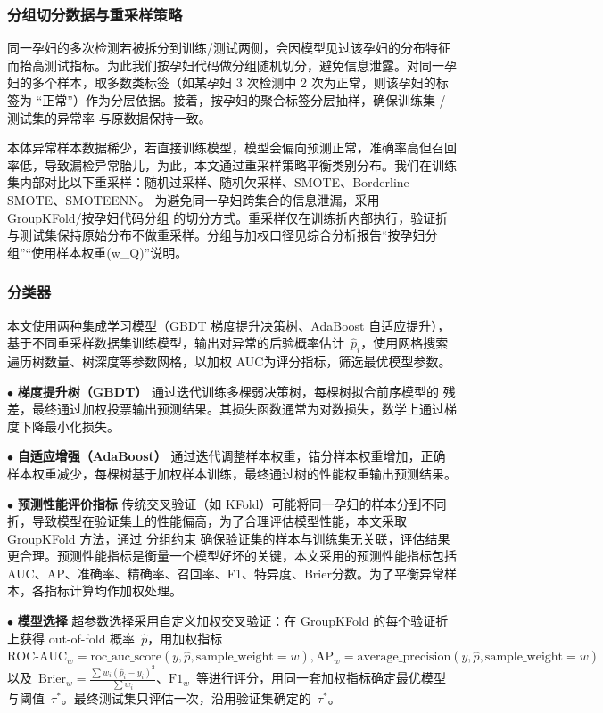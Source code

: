 \subsubsection{分组切分数据与重采样策略 }

同一孕妇的多次检测若被拆分到训练/测试两侧，会因模型见过该孕妇的分布特征而抬高测试指标。为此我们按孕妇代码做分组随机切分，避免信息泄露。对同一孕妇的多个样本，取多数类标签（如某孕妇 3 次检测中 2 次为正常，则该孕妇的标签为 “正常”）作为分层依据。接着，按孕妇的聚合标签分层抽样，确保训练集 / 测试集的异常率 与原数据保持一致。

本体异常样本数据稀少，若直接训练模型，模型会偏向预测正常，准确率高但召回率低，导致漏检异常胎儿，为此，本文通过重采样策略平衡类别分布。我们在训练集内部对比以下重采样：随机过采样、随机欠采样、SMOTE、Borderline-SMOTE、SMOTEENN。
为避免同一孕妇跨集合的信息泄漏，采用 GroupKFold/按孕妇代码分组 的切分方式。重采样仅在训练折内部执行，验证折与测试集保持原始分布不做重采样。分组与加权口径见综合分析报告“按孕妇分组”“使用样本权重(w\_Q)”说明。

\subsubsection{分类器}

本文使用两种集成学习模型（GBDT 梯度提升决策树、AdaBoost 自适应提升），基于不同重采样数据集训练模型，输出对异常的后验概率估计 \(\hat{p}_i\)，使用网格搜索遍历树数量、树深度等参数网格，以加权 AUC为评分指标，筛选最优模型参数。

\noindent $\bullet$ \textbf{梯度提升树（GBDT）} 通过迭代训练多棵弱决策树，每棵树拟合前序模型的 残差，最终通过加权投票输出预测结果。其损失函数通常为对数损失，数学上通过梯度下降最小化损失。

\noindent $\bullet$ \textbf{自适应增强（AdaBoost）} 通过迭代调整样本权重，错分样本权重增加，正确样本权重减少，每棵树基于加权样本训练，最终通过树的性能权重输出预测结果。

\noindent $\bullet$ \textbf{预测性能评价指标} 传统交叉验证（如 KFold）可能将同一孕妇的样本分到不同折，导致模型在验证集上的性能偏高，为了合理评估模型性能，本文采取GroupKFold 方法，通过 分组约束 确保验证集的样本与训练集无关联，评估结果更合理。预测性能指标是衡量一个模型好坏的关键，本文采用的预测性能指标包括AUC、AP、准确率、精确率、召回率、F1、特异度、Brier分数。为了平衡异常样本，各指标计算均作加权处理。

\noindent $\bullet$ \textbf{模型选择 } 超参数选择采用自定义加权交叉验证：在 GroupKFold 的每个验证折上获得 out-of-fold 概率 \(\hat{p}\)，用加权指标\(\text{ROC-AUC}_w = \text{roc\_auc\_score}(y, \hat{p}, \text{sample\_weight} = w), 
\text{AP}_w = \text{average\_precision}(y, \hat{p}, \text{sample\_weight} = w) \)
以及 \(\text{Brier}_w = \frac{\sum w_i (\hat{p}_i - y_i)^2}{\sum w_i}\)、\(\text{F1}_w\) 等进行评分，用同一套加权指标确定最优模型与阈值 \(\tau^*\)。最终测试集只评估一次，沿用验证集确定的 \(\tau^*\)。

